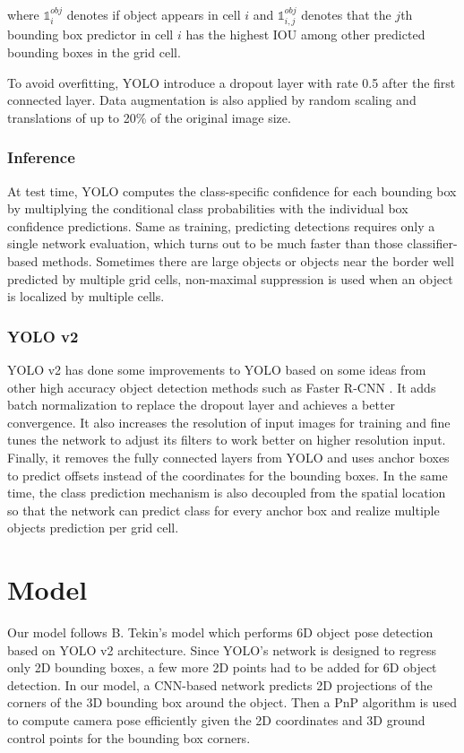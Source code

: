 where $ \mathbb{1}_{i}^{obj} $ denotes if object appears in cell $ i $ and $ \mathbb{1}_{i,j}^{obj} $ denotes that the $j$th bounding box predictor in cell $ i $ has the highest IOU among other predicted bounding boxes in the grid cell.

To avoid overfitting, YOLO introduce a dropout layer with rate 0.5 after the first connected layer. Data augmentation is also applied by random scaling and translations of up to 20\% of the original image size.

\subsubsection{Inference}

At test time, YOLO computes the class-specific confidence for each bounding box by multiplying the conditional class probabilities with the individual box confidence predictions. Same as training, predicting detections requires only a single network evaluation, which turns out to be much faster than those classifier-based methods. Sometimes there are large objects or objects near the border well predicted by multiple grid cells, non-maximal suppression is used when an object is localized by multiple cells.

\subsubsection{YOLO v2}
YOLO v2 has done some improvements to YOLO based on some ideas from other high accuracy object detection methods such as Faster R-CNN \cite{}. It adds batch normalization to replace the dropout layer and achieves a better convergence. It also increases the resolution of input images for training and fine tunes the network to adjust its filters to work better on higher resolution input. Finally, it removes the fully connected layers from YOLO and uses anchor boxes to predict offsets instead of the coordinates for the bounding boxes. In the same time, the class prediction mechanism is also decoupled from the spatial location so that the network can predict class for every anchor box and realize multiple objects prediction per grid cell.

\section{Model}

Our model follows B. Tekin's model \cite{tekin2018real} which performs 6D object pose detection based on YOLO v2 architecture. Since YOLO's network is designed to regress only 2D bounding boxes, a few more 2D points had to be added for 6D object detection. In our model, a CNN-based network predicts 2D projections of the corners of the 3D bounding box around the object. Then a PnP algorithm is used to compute camera pose efficiently given the 2D coordinates and 3D ground control points for the bounding box corners.

